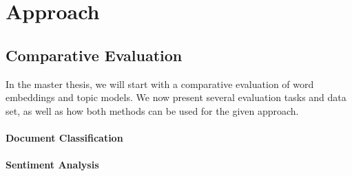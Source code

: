 \documentclass{sig-alternate-05-2015}
\begin{document}



\section{Approach}

\subsection{Comparative Evaluation}
In the master thesis, we will start with a comparative evaluation of word embeddings and topic models.
We now present several evaluation tasks and data set, as well as how both methods can be used for the given approach.


\paragraph{Document Classification}
\paragraph{Sentiment Analysis}

\end{document}

